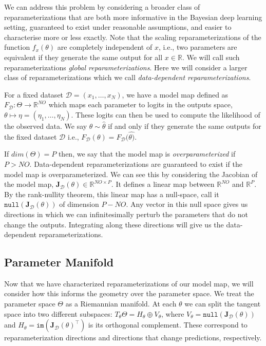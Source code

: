 We can address this problem by considering a broader class of reparameterizations that are both more informative in the Bayesian deep learning setting, guaranteed to exist under reasonable assumptions, and easier to characterise more or less exactly. Note that the scaling reparameterizations of the function $f_x(\theta)$ are completely independent of $x$, i.e., two parameters are equivalent if they generate the same output for all $x\in \mathbb{R}$. We will call such reparameterizations \emph{global reparameterizations}. Here we will consider a larger class of reparameterizations which we call \emph{data-dependent reparameterizations}.  

For a fixed dataset $\mathcal{D}= (x_1, \dots, x_N)$, we have a model map defined as $F_{\mathcal D}:\Theta\to \mathbb R^{NO}$ which maps each parameter to logits in the outputs space, $\theta \mapsto \eta = (\eta_1, \dots, \eta_N)$. These logits can then be used to compute the likelihood of the observed data. We say $\theta \sim \hat{\theta}$ if and only if they generate the same outputs for the fixed dataset $\mathcal D $ i.e., $F_{\mathcal D}(\theta) = F_{\mathcal D}(\hat{\theta)}$.

If $dim(\Theta) = P$ then, we say that the model map is \emph{overparameterized} if $P > NO$. Data-dependent reparameterizations are guaranteed to exist if the model map is overparameterized. We can see this by considering the Jacobian of the model map, $\mathbf{J}_\mathcal{D}(\theta) \in \mathbb{R}^{NO \times P}$. It defines a linear map between $\mathbb{R}^{NO}$ and $\mathbb{R}^P$. By the rank-nullity theorem, this linear map has a null-space, call it $\texttt{null}(\mathbf{J}_\mathcal{D}(\theta))$ of dimension $P - NO$. Any vector in this null space gives us directions in which we can infinitesimally perturb the parameters that do not change the outputs. Integrating along these directions will give us the data-dependent reparameterizations.

\subsection{Parameter Manifold}
Now that we have characterized reparameterizations of our model map, we will consider how this informs the geometry over the parameter space. We treat the parameter space $\Theta$ as a Riemannian manifold. At each $\theta$ we can split the tangent space into two different subspaces: $T_\theta\Theta = H_\theta \oplus V_\theta$, where $V_\theta = \texttt{null}(\mathbf{J}_\mathcal{D}(\theta))$ and $H_\theta = \texttt{im}(\mathbf{J}_\mathcal{D}(\theta)^\top)$ is its orthogonal complement. These correspond to reparameterization directions and directions that change predictions, respectively. 

